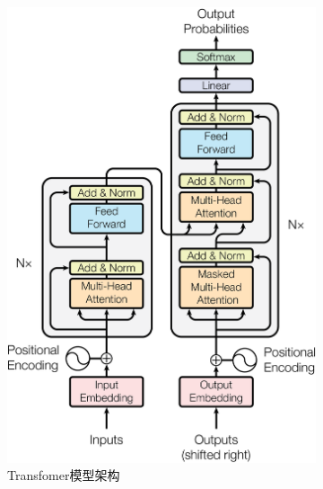 \documentclass[a4paper]{report}
\begin{document}
\begin{figure}[H]
	\centering
	\begin{subfigure}[b]{0.4\textwidth}
		\centering
		\includegraphics[width=\textwidth]{figures/ModalNet-21.png}
		\caption{Transfomer模型架构}
		\label{Transfomer模型架构}
	\end{subfigure}
	\hfill
	\begin{subfigure}[b]{0.4\textwidth}
		\centering

\end{subfigure}
\end{figure}
\end{document}
